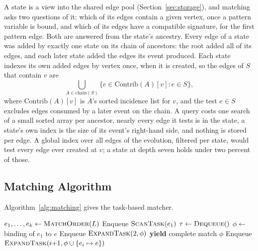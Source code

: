 A state is a view into the shared edge pool (Section~\ref{sec:storage}), and matching asks two
questions of it: which of its edges contain a given vertex, once a pattern variable is bound, and
which of its edges have a compatible signature, for the first pattern edge. Both are answered from
the state's ancestry. Every edge of a state was added by exactly one state on its chain of
ancestors: the root added all of its edges, and each later state added the edges its event
produced. Each state indexes its own added edges by vertex once, when it is created, so the edges
of $S$ that contain $v$ are
\begin{equation}
    \bigcup_{A \in \text{chain}(S)} \{e \in \text{Contrib}(A)[v] : e \in S\},
\end{equation}
where $\text{Contrib}(A)[v]$ is $A$'s sorted incidence list for $v$, and the test $e \in S$
excludes edges consumed by a later event on the chain. A query costs one search of a small sorted
array per ancestor, nearly every edge it tests is in the state, a state's own index is the size of
its event's right-hand side, and nothing is stored per edge. A global index over all edges of the
evolution, filtered per state, would test every edge ever created at $v$; a state at depth seven
holds under two percent of those.

\subsection{Matching Algorithm}
\label{sec:matching-algorithm}

Algorithm~\ref{alg:matching} gives the task-based matcher.

\begin{algorithm}[htbp]
\caption{Task-Based Pattern Matching}
\label{alg:matching}
\begin{algorithmic}[1]
    \State $e_1, \ldots, e_k \gets \textsc{MatchOrder}(L)$ 
    \State Enqueue $\textsc{ScanTask}(e_1)$
        \State $\tau \gets \textsc{Dequeue}()$
                \State $\phi \gets$ binding of $e_1$ to $e$
                \State Enqueue $\textsc{ExpandTask}(2, \phi)$
            \EndFor
                \State \textbf{yield} complete match $\phi$
            \Else
                        \State Enqueue $\textsc{ExpandTask}(i{+}1, \phi \cup \{e_i \mapsto e\})$
                    \EndIf
                \EndFor
            \EndIf
        \EndIf
    \EndWhile
\EndProcedure
\end{algorithmic}
\end{algorithm}

